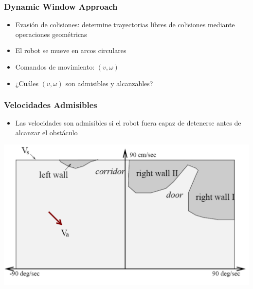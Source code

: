 \begin{frame}
	\frametitle{Dynamic Window Approach}
	
    \begin{itemize}
        \item Evasión de colisiones: determine trayectorias libres de colisiones mediante operaciones geométricas
        \item El robot se mueve en arcos circulares
        \item Comandos de movimiento: $(v,\omega)$
        \item ¿Cuáles $(v,\omega)$ son admisibles y alcanzables?
    \end{itemize}
    
\end{frame}

\begin{frame}
    \frametitle{Velocidades Admisibles}
    
    \begin{itemize}
        \item Las velocidades son admisibles si el robot fuera capaz de detenerse antes de alcanzar el obstáculo
    \end{itemize}
    
    \begin{center}
        \includegraphics[width=0.6\columnwidth]{images/dynamic_window_approach_admisible_velocities.pdf}
    \end{center}
    
    
    
    
\end{frame}

